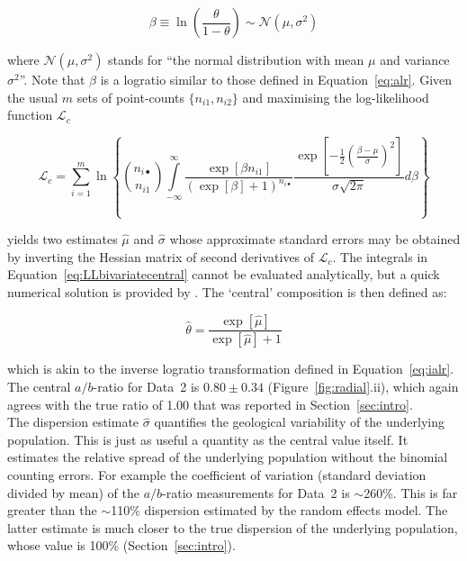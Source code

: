 \documentclass{article}
\begin{document}
\begin{equation}
  \beta \equiv \ln\left(\frac{\theta}{1-\theta}\right)
  \sim \mathcal{N}(\mu,\sigma^2)
  \label{eq:logTheta}
\end{equation}

\noindent where $\mathcal{N}(\mu,\sigma^2)$ stands for ``the normal
distribution with mean $\mu$ and variance $\sigma^2$''. Note that
$\beta$ is a logratio similar to those defined in
Equation~\ref{eq:alr}. Given the usual $m$ sets of point-counts
$\{n_{i1},n_{i2}\}$ and maximising the log-likelihood function
$\mathcal{L}_c$

\begin{equation}
  \mathcal{L}_c = \sum\limits_{i=1}^{m}\ln\left\{
  \binom{n_{i\bullet}}{n_{i1}}
  \int\limits_{-\infty}^{\infty}
  \frac{\exp\left[\beta n_{i1}\right]}
       {\left(\exp\left[\beta\right] + 1\right)^{n_{i\bullet}}}
  \frac{\exp\left[
         -\frac{1}{2}\left(\frac{\beta-\mu}{\sigma}\right)^2
         \right]}
       {\sigma\sqrt{2\pi}}
       d\beta\right\}
\label{eq:LLbivariatecentral}
\end{equation}

\noindent yields two estimates $\hat{\mu}$ and $\hat{\sigma}$ whose
approximate standard errors may be obtained by inverting the Hessian
matrix of second derivatives of $\mathcal{L}_c$. The integrals in
Equation~\ref{eq:LLbivariatecentral} cannot be evaluated analytically,
but a quick numerical solution is provided by
\citet{galbraith1993}. The `central' composition is then defined as:

\begin{equation}
  \hat{\theta} = \frac{\exp[\hat{\mu}]}{\exp[\hat{\mu}] + 1}
\end{equation}

\noindent which is akin to the inverse logratio transformation defined
in Equation~\ref{eq:ialr}. The central $a/b$-ratio for Data~2 is $0.80
\pm 0.34$ (Figure~\ref{fig:radial}.ii), which again agrees with the
true ratio of 1.00 that was reported in Section~\ref{sec:intro}.\\

The dispersion estimate $\hat{\sigma}$ quantifies the geological
variability of the underlying population. This is just as useful a
quantity as the central value itself. It estimates the relative spread
of the underlying population without the binomial counting errors. For
example the coefficient of variation (standard deviation divided by
mean) of the $a/b$-ratio measurements for Data~2 is $\sim$260\%.  This
is far greater than the $\sim$110\% dispersion estimated by the random
effects model. The latter estimate is much closer to the true
dispersion of the underlying population, whose value is 100\%
(Section~\ref{sec:intro}).\\
\end{document}
